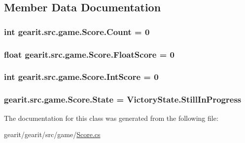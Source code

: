 \subsection{Member Data Documentation}
\hypertarget{classgearit_1_1src_1_1game_1_1_score_af68b443883a7545b7dd18c4242e3992b}{
\subsubsection[{Count}]{\setlength{\rightskip}{0pt plus 5cm}int gearit.\+src.\+game.\+Score.\+Count = 0}}\label{classgearit_1_1src_1_1game_1_1_score_af68b443883a7545b7dd18c4242e3992b}
\hypertarget{classgearit_1_1src_1_1game_1_1_score_a053a9a27c6751a9cb1aeb0aad52cbee5}{
\subsubsection[{Float\+Score}]{\setlength{\rightskip}{0pt plus 5cm}float gearit.\+src.\+game.\+Score.\+Float\+Score = 0}}\label{classgearit_1_1src_1_1game_1_1_score_a053a9a27c6751a9cb1aeb0aad52cbee5}
\hypertarget{classgearit_1_1src_1_1game_1_1_score_a5637f26e62cfb82faa0da93cc79afded}{
\subsubsection[{Int\+Score}]{\setlength{\rightskip}{0pt plus 5cm}int gearit.\+src.\+game.\+Score.\+Int\+Score = 0}}\label{classgearit_1_1src_1_1game_1_1_score_a5637f26e62cfb82faa0da93cc79afded}
\hypertarget{classgearit_1_1src_1_1game_1_1_score_a3753daefe8606c4c5d8b2baa4b773218}{
\subsubsection[{State}]{ gearit.\+src.\+game.\+Score.\+State = Victory\+State.\+Still\+In\+Progress}}\label{classgearit_1_1src_1_1game_1_1_score_a3753daefe8606c4c5d8b2baa4b773218}


The documentation for this class was generated from the following file\+:\begin{DoxyCompactItemize}
\item 
gearit/gearit/src/game/\hyperlink{_score_8cs}{Score.\+cs}\end{DoxyCompactItemize}
